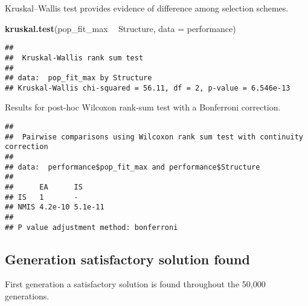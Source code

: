 \documentclass[]{book}
\newenvironment{Shaded}{\begin{snugshade}}{\end{snugshade}}
\newcommand{\DataTypeTok}[1]{\textcolor[rgb]{0.13,0.29,0.53}{#1}}
\newcommand{\KeywordTok}[1]{\textcolor[rgb]{0.13,0.29,0.53}{\textbf{#1}}}
\newcommand{\NormalTok}[1]{#1}
\newcommand{\OperatorTok}[1]{\textcolor[rgb]{0.81,0.36,0.00}{\textbf{#1}}}
\newcommand{\OtherTok}[1]{\textcolor[rgb]{0.56,0.35,0.01}{#1}}
\newcommand{\StringTok}[1]{\textcolor[rgb]{0.31,0.60,0.02}{#1}}
\begin{document}
Kruskal--Wallis test provides evidence of difference among selection schemes.

\begin{Shaded}
\begin{Highlighting}[]
\KeywordTok{kruskal.test}\NormalTok{(pop_fit_max }\OperatorTok{~}\StringTok{ }\NormalTok{Structure, }\DataTypeTok{data =}\NormalTok{ performance)}
\end{Highlighting}
\end{Shaded}

\begin{verbatim}
## 
##  Kruskal-Wallis rank sum test
## 
## data:  pop_fit_max by Structure
## Kruskal-Wallis chi-squared = 56.11, df = 2, p-value = 6.546e-13
\end{verbatim}

Results for post-hoc Wilcoxon rank-sum test with a Bonferroni correction.

\begin{Shaded}
\end{Shaded}

\begin{verbatim}
## 
##  Pairwise comparisons using Wilcoxon rank sum test with continuity correction 
## 
## data:  performance$pop_fit_max and performance$Structure 
## 
##      EA      IS     
## IS   1       -      
## NMIS 4.2e-10 5.1e-11
## 
## P value adjustment method: bonferroni
\end{verbatim}

\hypertarget{generation-satisfactory-solution-found-15}{%
\subsection{Generation satisfactory solution found}\label{generation-satisfactory-solution-found-15}}

First generation a satisfactory solution is found throughout the 50,000 generations.
\end{document}
